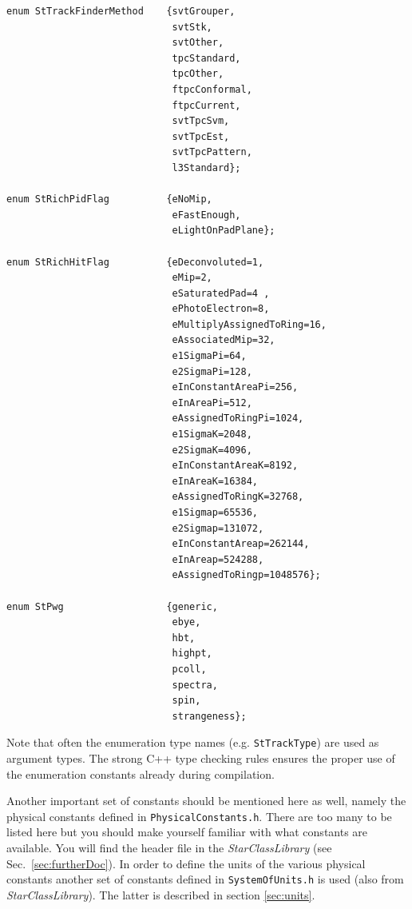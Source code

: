 \documentclass[twoside]{article}
\newcommand{\name}[1]{\textsl{#1}}%
\begin{document}
\begin{verbatim}
enum StTrackFinderMethod    {svtGrouper,
                             svtStk,
                             svtOther,
                             tpcStandard,
                             tpcOther,
                             ftpcConformal,
                             ftpcCurrent,
                             svtTpcSvm,
                             svtTpcEst,
                             svtTpcPattern,
                             l3Standard};

enum StRichPidFlag          {eNoMip,
                             eFastEnough,
                             eLightOnPadPlane};

enum StRichHitFlag          {eDeconvoluted=1,
                             eMip=2,
                             eSaturatedPad=4 ,
                             ePhotoElectron=8,
                             eMultiplyAssignedToRing=16,
                             eAssociatedMip=32,
                             e1SigmaPi=64,
                             e2SigmaPi=128,
                             eInConstantAreaPi=256,
                             eInAreaPi=512,
                             eAssignedToRingPi=1024,
                             e1SigmaK=2048,
                             e2SigmaK=4096,
                             eInConstantAreaK=8192,
                             eInAreaK=16384,
                             eAssignedToRingK=32768,
                             e1Sigmap=65536,
                             e2Sigmap=131072,
                             eInConstantAreap=262144,
                             eInAreap=524288,
                             eAssignedToRingp=1048576};

enum StPwg                  {generic,
                             ebye,
                             hbt,
                             highpt,
                             pcoll,
                             spectra,
                             spin,
                             strangeness};
\end{verbatim}

Note that often the enumeration type names (e.g. \texttt{StTrackType})
are used as argument types. The strong C++ type checking rules ensures
the proper use of the enumeration constants already during
compilation.

Another important set of constants should be mentioned here as well,
namely the physical constants defined in \texttt{PhysicalConstants.h}.
There are too many to be listed here but you should make yourself
familiar with what constants are available. You will find the header
file in the \name{StarClassLibrary} (see Sec.~\ref{sec:furtherDoc}).
 In order to define the units of the various
physical constants another set of constants defined in
\texttt{SystemOfUnits.h} is used (also from \name{StarClassLibrary}).
The latter is described in section \ref{sec:units}.
\end{document}
